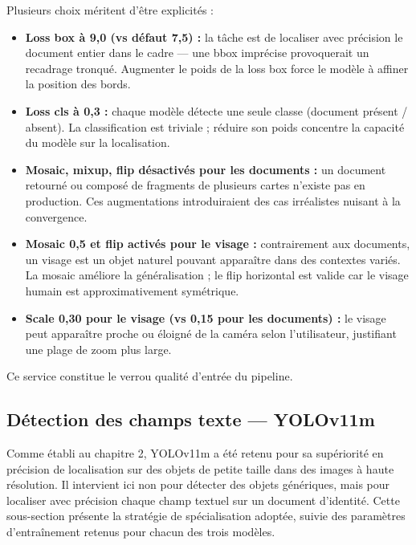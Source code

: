 Plusieurs choix méritent d'être explicités :

\begin{itemize}
  \item \textbf{Loss box à 9,0 (vs défaut 7,5) :} la tâche est de localiser avec précision le document entier dans le cadre --- une bbox imprécise provoquerait un recadrage tronqué. Augmenter le poids de la loss box force le modèle à affiner la position des bords.
  \item \textbf{Loss cls à 0,3 :} chaque modèle détecte une seule classe (document présent / absent). La classification est triviale ; réduire son poids concentre la capacité du modèle sur la localisation.
  \item \textbf{Mosaic, mixup, flip désactivés pour les documents :} un document retourné ou composé de fragments de plusieurs cartes n'existe pas en production. Ces augmentations introduiraient des cas irréalistes nuisant à la convergence.
  \item \textbf{Mosaic 0,5 et flip activés pour le visage :} contrairement aux documents, un visage est un objet naturel pouvant apparaître dans des contextes variés. La mosaic améliore la généralisation ; le flip horizontal est valide car le visage humain est approximativement symétrique.
  \item \textbf{Scale 0,30 pour le visage (vs 0,15 pour les documents) :} le visage peut apparaître proche ou éloigné de la caméra selon l'utilisateur, justifiant une plage de zoom plus large.
\end{itemize}

Ce service constitue le verrou qualité d'entrée du pipeline.

\subsection{Détection des champs texte --- YOLOv11m}
\label{subsec:yolov11m-champs}

Comme établi au chapitre 2, YOLOv11m a été retenu pour sa supériorité en précision de localisation sur des objets de petite taille dans des images à haute résolution. Il intervient ici non pour détecter des objets génériques, mais pour localiser avec précision chaque champ textuel sur un document d'identité. Cette sous-section présente la stratégie de spécialisation adoptée, suivie des paramètres d'entraînement retenus pour chacun des trois modèles.

